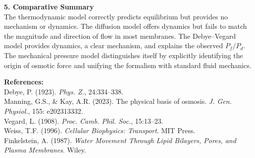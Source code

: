 \begin{technical}
\noindent\textbf{5. Comparative Summary}\\[0.5em]
The thermodynamic model correctly predicts equilibrium but provides no mechanism or dynamics. The diffusion model offers dynamics but fails to match the magnitude and direction of flow in most membranes. The Debye–Vegard model provides dynamics, a clear mechanism, and explains the observed $P_f / P_d$. The mechanical pressure model distinguishes itself by explicitly identifying the origin of osmotic force and unifying the formalism with standard fluid mechanics.

\vspace{0.5em}
\noindent\textbf{References:}\\
Debye, P. (1923). \textit{Phys. Z.}, 24:334--338.\\
Manning, G.S., \& Kay, A.R. (2023). The physical basis of osmosis. \textit{J. Gen. Physiol.}, 155: e202313332.\\
Vegard, L. (1908). \textit{Proc. Camb. Phil. Soc.}, 15:13--23.\\
Weiss, T.F. (1996). \textit{Cellular Biophysics: Transport}. MIT Press.\\
Finkelstein, A. (1987). \textit{Water Movement Through Lipid Bilayers, Pores, and Plasma Membranes}. Wiley.
\end{technical}
